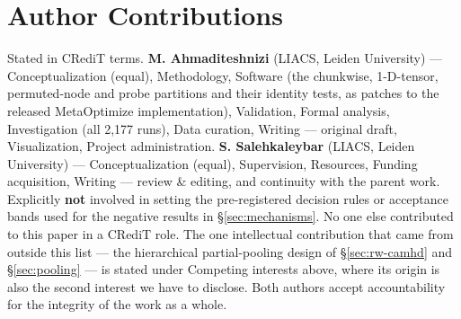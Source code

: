\documentclass[10pt,letterpaper]{article}
\begin{document}
\section*{Author Contributions}
Stated in CRediT terms.
\textbf{M. Ahmaditeshnizi} (LIACS, Leiden University) --- Conceptualization (equal), Methodology,
Software (the chunkwise,
1-D-tensor, permuted-node and probe partitions and their identity tests, as patches to the released
MetaOptimize implementation), Validation, Formal analysis, Investigation (all 2{,}177 runs), Data
curation, Writing --- original draft, Visualization, Project administration.
\textbf{S. Salehkaleybar} (LIACS, Leiden University) --- Conceptualization (equal), Supervision,
Resources, Funding
acquisition, Writing --- review \& editing, and continuity with the parent work. Explicitly
\textbf{not} involved in setting the pre-registered decision rules or acceptance bands used for the
negative results in \S\ref{sec:mechanisms}.
No one else contributed to this paper in a CRediT role. The one intellectual contribution that came
from outside this list --- the hierarchical partial-pooling design of \S\ref{sec:rw-camhd} and
\S\ref{sec:pooling} --- is stated under Competing interests above, where its origin is also the
second interest we have to disclose.
Both authors accept accountability for the integrity of the work as a whole.
\end{document}
